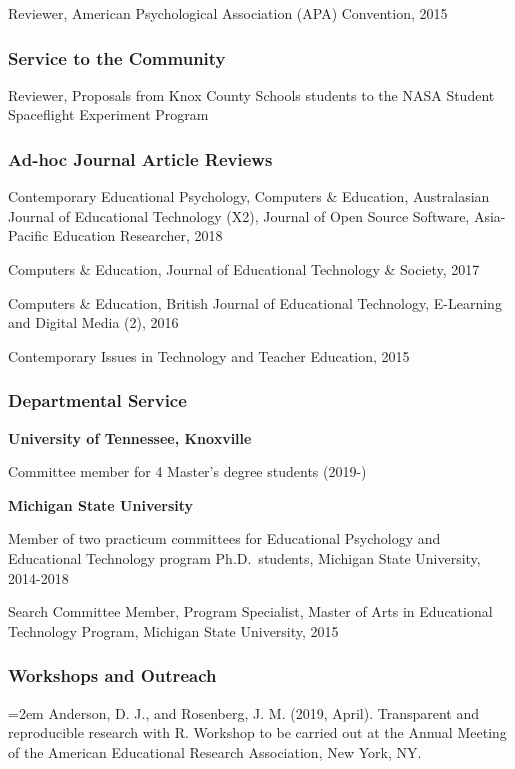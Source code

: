 \documentclass[]{article}
\begin{document}
Reviewer, American Psychological Association (APA) Convention, 2015

\subsubsection{Service to the Community}\label{service-to-the-community}

Reviewer, Proposals from Knox County Schools students to the NASA
Student Spaceflight Experiment Program

\subsubsection{Ad-hoc Journal Article
Reviews}\label{ad-hoc-journal-article-reviews}

Contemporary Educational Psychology, Computers \& Education,
Australasian Journal of Educational Technology (X2), Journal of Open
Source Software, Asia-Pacific Education Researcher, 2018

Computers \& Education, Journal of Educational Technology \& Society,
2017

Computers \& Education, British Journal of Educational Technology,
E-Learning and Digital Media (2), 2016

Contemporary Issues in Technology and Teacher Education, 2015

\subsubsection{Departmental Service}\label{departmental-service}

\textbf{University of Tennessee, Knoxville}

Committee member for 4 Master's degree students (2019-)

\textbf{Michigan State University}

Member of two practicum committees for Educational Psychology and
Educational Technology program Ph.D.~students, Michigan State
University, 2014-2018

Search Committee Member, Program Specialist, Master of Arts in
Educational Technology Program, Michigan State University, 2015

\subsubsection{Workshops and Outreach}\label{workshops-and-outreach}

\hangindent=2em Anderson, D. J., and Rosenberg, J. M. (2019, April).
Transparent and reproducible research with R. Workshop to be carried out
at the Annual Meeting of the American Educational Research Association,
New York, NY.
\end{document}
